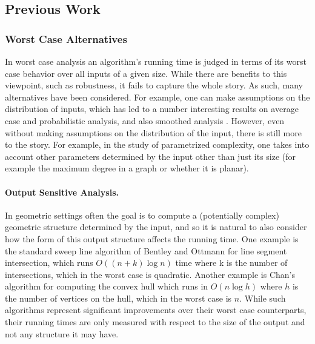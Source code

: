 \documentclass[11pt]{article}
\theoremstyle{definition}
\begin{document}
% 

\subsection{Previous Work}

\subsubsection{Worst Case Alternatives}
In worst case analysis an algorithm's running time is judged in terms of its worst 
case behavior over all inputs of a given size.  While there are benefits to this viewpoint, 
such as robustness,  it fails to capture the whole story.  As such, many alternatives 
have been considered.  For example, one can make assumptions on the distribution of 
inputs, which has led to a number interesting results on average case and probabilistic 
analysis, and also smoothed analysis \cite{st-saa-04}.  However, even without making 
assumptions on the distribution of the input, there is still more to the story.
For example, in the study of parametrized complexity, one takes into account other 
parameters determined by the input other than just its size (for example the maximum 
degree in a graph or whether it is planar).

\paragraph{Output Sensitive Analysis.}
In geometric settings often the goal is to compute a (potentially complex) geometric structure determined 
by the input, and so it is natural to also consider how the form of this output structure affects the running time.
One example is the standard sweep line algorithm of Bentley and Ottmann \cite{bo-arcgi-79} for line segment intersection, 
which runs $O((n+k)\log n)$ time where k is the number of intersections, which in the worst case is quadratic.
Another example is Chan's algorithm for computing the convex hull \cite{c-ooscha-96} which runs in $O(n\log h)$ 
where $h$ is the number of vertices on the hull, which in the worst case is $n$.  While such algorithms represent 
significant improvements over their worst case counterparts, their running times are only measured with respect 
to the size of the output and not any structure it may have.
\end{document}
